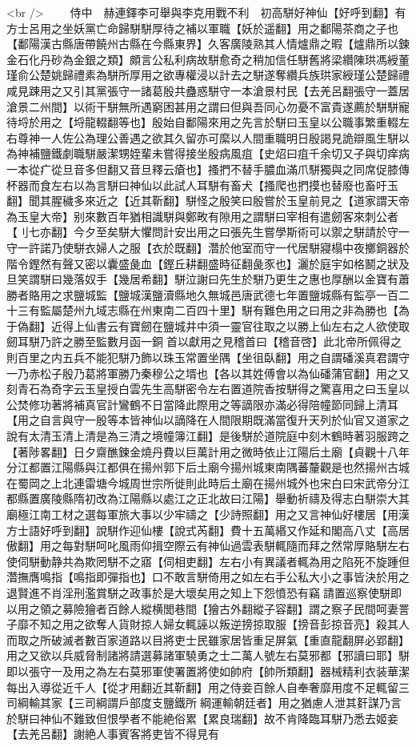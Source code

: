 <br />
　　侍中　赫連鐸李可舉與李克用戰不利　初高駢好神仙【好呼到翻】有方士呂用之坐妖黨亡命歸駢駢厚待之補以軍職【妖於遥翻】用之鄱陽茶商之子也【鄱陽漢古縣唐帶饒州古縣在今縣東界】久客廣陵熟其人情爐鼎之暇【爐鼎所以鍊金石化丹砂為金銀之類】頗言公私利病故駢愈奇之稍加信任駢舊將梁纘陳珙馮綬董瑾俞公楚姚歸禮素為駢所厚用之欲專權浸以計去之駢遂奪纘兵族珙家綬瑾公楚歸禮咸見踈用之又引其黨張守一諸葛殷共蠱惑駢守一本滄景村民【去羌呂翻張守一蓋居滄景二州間】以術干駢無所遇窮困甚用之謂曰但與吾同心勿憂不富貴遂薦於駢駢寵待埒於用之【埒龍輟翻等也】殷始自鄱陽來用之先言於駢曰玉皇以公職事繁重輟左右尊神一人佐公為理公善遇之欲其久留亦可縻以人間重職明日殷謁見詭辯風生駢以為神補鹽鐵劇職駢嚴潔甥姪輩未嘗得接坐殷病風疽【史炤曰疽千余切又子與切痒病一本從疒從旦音多但翻又音旦釋云瘡也】搔捫不替手膿血滿爪駢獨與之同席促膝傳杯器而食左右以為言駢曰神仙以此試人耳駢有畜犬【搔爬也捫摸也替廢也畜吁玉翻】聞其腥穢多來近之【近其靳翻】駢怪之殷笑曰殷嘗於玉皇前見之【道家謂天帝為玉皇大帝】别來數百年猶相識駢與鄭畋有隙用之謂駢曰宰相有遣劒客來刺公者【刂七亦翻】今夕至矣駢大懼問計安出用之曰張先生嘗學斯術可以禦之駢請於守一守一許諾乃使駢衣婦人之服【衣於既翻】濳於他室而守一代居駢寢榻中夜擲銅器於階令鏗然有聲又密以囊盛彘血【鏗丘耕翻盛時征翻彘豕也】灑於庭宇如格鬭之狀及旦笑謂駢曰幾落奴手【幾居希翻】駢泣謝曰先生於駢乃更生之惠也厚酬以金寶有蕭勝者賂用之求鹽城監【鹽城漢鹽瀆縣地久無城邑唐武德七年置鹽城縣有監亭一百二十三有監屬楚州九域志縣在州東南二百四十里】駢有難色用之曰用之非為勝也【為于偽翻】近得上仙書云有寶劒在鹽城井中須一靈官往取之以勝上仙左右之人欲使取劒耳駢乃許之勝至監數月函一銅首以獻用之見稽首曰【稽音啓】此北帝所佩得之則百里之内五兵不能犯駢乃飾以珠玉常置坐隅【坐徂臥翻】用之自謂磻溪真君謂守一乃赤松子殷乃葛將軍勝乃秦穆公之壻也【各以其姓傅會以為仙磻蒲官翻】用之又刻青石為奇字云玉皇授白雲先生高駢密令左右置道院香按駢得之驚喜用之曰玉皇以公焚修功著將補真官計鸞鶴不日當降此際用之等謫限亦滿必得陪幢節同歸上清耳【用之自言與守一殷等本皆神仙以謫降在人間限期既滿當復升天列於仙官又道家之說有太清玉清上清是為三清之境幢簿江翻】是後駢於道院庭中刻木鶴時著羽服跨之【著陟畧翻】日夕齋醮鍊金燒丹費以巨萬計用之微時依止江陽后土廟【貞觀十八年分江都置江陽縣與江都俱在揚州郭下后土廟今揚州城東南隅蕃釐觀是也然揚州古城在蜀岡之上北連雷塘今城周世宗所徙則此時后土廟在揚州城外也宋白曰宋武帝分江都縣置廣陵縣隋初改為江陽縣以處江之正北故曰江陽】舉動祈禱及得志白駢崇大其廟極江南工材之選每軍旅大事以少牢禱之【少詩照翻】用之又言神仙好樓居【用漢方士語好呼到翻】說駢作迎仙樓【說式芮翻】費十五萬緡又作延和閣高八丈【高居傲翻】用之每對駢呵叱風雨仰揖空際云有神仙過雲表駢輒隨而拜之然常厚賂駢左右使伺駢動静共為欺罔駢不之寤【伺相吏翻】左右小有異議者輒為用之陷死不旋踵但濳撫膺鳴指【鳴指即彈指也】口不敢言駢倚用之如左右手公私大小之事皆決於用之退賢進不肖淫刑濫賞駢之政事於是大壞矣用之知上下怨憤恐有竊請置巡察使駢即以用之領之募險獪者百餘人縱横閭巷間【獪古外翻縱子容翻】謂之察子民間呵妻詈子靡不知之用之欲奪人貨財掠人婦女輒誣以叛逆搒掠取服【搒音彭掠音亮】殺其人而取之所破滅者數百家道路以目將吏士民雖家居皆重足屏氣【重直龍翻屏必郢翻】用之又欲以兵威脅制諸將請選募諸軍驍勇之士二萬人號左右莫邪都【邪讀曰耶】駢即以張守一及用之為左右莫邪軍使署置將使如帥府【帥所類翻】器械精利衣装華潔每出入導從近千人【從才用翻近其靳翻】用之侍妾百餘人自奉奢靡用度不足輒留三司綱輸其家【三司綱謂戶部度支鹽鐵所綱運輸朝廷者】用之猶慮人泄其姧謀乃言於駢曰神仙不難致但恨學者不能絶俗累【累良瑞翻】故不肯降臨耳駢乃悉去姬妾【去羌呂翻】謝絶人事賓客將吏皆不得見有